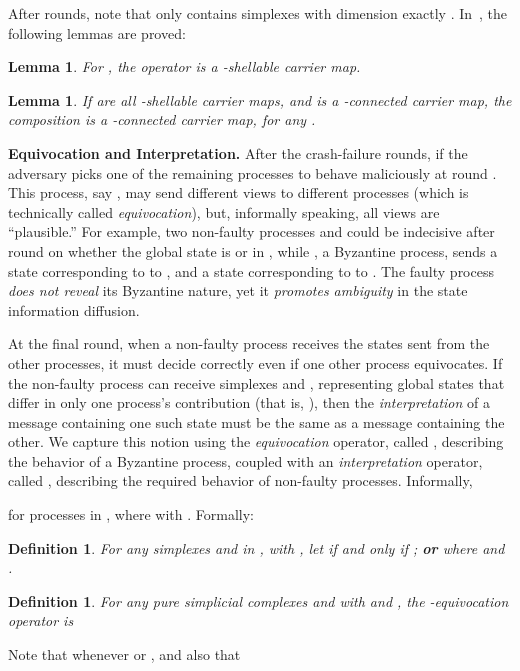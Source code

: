 \documentclass[11pt]{article}
\newtheorem{definition}[theorem]{Definition}
\newtheorem{lemma}[theorem]{Lemma}
\begin{document}
After  rounds,
note that  only contains simplexes with dimension exactly .
In~\cite{ConcurrentShellable,MauriceBook},
the following lemmas are proved:

\begin{lemma}
\label{lemma-crashshellable}
For ,
the operator  is a -shellable carrier map.
\end{lemma}


\begin{lemma}
\label{lemma-compositionshellable}
If  are all -shellable carrier maps,
and  is a -connected carrier map,
the composition  is a -connected carrier map,
for any .
\end{lemma}


\textbf{Equivocation and Interpretation. }
After the crash-failure rounds,
if 
the adversary picks one of the remaining processes to behave maliciously at round .
This process, say , may send different views to different processes
(which is technically called \emph{equivocation}),
but,
informally speaking,
all views are ``plausible.''
For example,
two non-faulty processes  and 
could be indecisive after round  on whether the global state
is  or  in ,
while ,
a Byzantine process,
sends a state corresponding to  to ,
and a state corresponding to  to .
The faulty process  \emph{does not reveal} its Byzantine nature,
yet it \emph{promotes ambiguity} in the state information diffusion.

At the final round,
when a non-faulty process receives the states sent from the other processes,
it must decide correctly even if one other process equivocates.
If the non-faulty process can receive simplexes  and ,
representing global states that differ in only one process's contribution
(that is, ),
then the \emph{interpretation} of a message containing one such state
must be the same as a message containing the other.
We capture this notion using the \emph{equivocation} operator,
called ,
describing the behavior of a Byzantine process,
coupled with an \emph{interpretation} operator,
called ,
describing the required behavior of non-faulty processes.
Informally,

for processes in ,
where  with .
Formally:

\begin{definition}
\label{definition-interp}
For any simplexes  and  in ,
with ,
let  if and only if
; \textbf{or}
 where  and .
\end{definition}

\begin{definition}
\label{definition-roundop-equivocate}
For any pure simplicial complexes  and 
with  and ,
the -equivocation operator  is

\end{definition}
Note that  whenever  or ,
and also that
\end{document}
